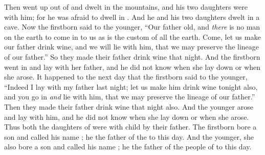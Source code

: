 
\bverse Then  went up out of  and dwelt in the mountains, and his two daughters were with him; for he was afraid to dwell in . And he and his two daughters dwelt in a cave.
\bverse Now the firstborn said to the younger, ``Our father \is old, and \textit{there} is no man on the earth to come in to us as is the custom of all the earth.
\bverse Come, let us make our father drink wine, and we will lie with him, that we may preserve the lineage of our father.''
\bverse So they made their father drink wine that night. And the firstborn went in and lay with her father, and he did not know when she lay down or when she arose.
\bverse It happened to the next day that the firstborn said to the younger, ``Indeed I lay with my father last night; let us make him drink wine tonight also, and you go in \textit{and} lie with him, that we may preserve the lineage of our father.''
\bverse Then they made their father drink wine that night also. And the younger arose and lay with him, and he did not know when she lay down or when she arose.
\bverse Thus both the daughters of  were with child by their father.
\bverse The firstborn bore a son and called his name ; he \is the father of the  to this day.
\bverse And the younger, she also bore a son and called his name ; he \is the father of the people of  to this day.
